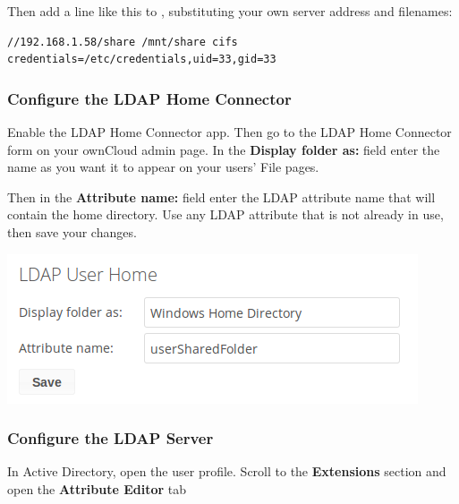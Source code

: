 \documentclass[letterpaper,10pt,english]{sphinxmanual}
\begin{document}
Then add a line like this to , substituting your own server
address and filenames:

\begin{Verbatim}[commandchars=\\\{\}]
//192.168.1.58/share /mnt/share cifs credentials=/etc/credentials,uid=33,gid=33
\end{Verbatim}


\subsubsection{Configure the LDAP Home Connector}
\label{enterprise_external_storage/ldap_home_connector_configuration:configure-the-ldap-home-connector}
Enable the LDAP Home Connector app. Then go to the LDAP Home Connector form
on your ownCloud admin page. In the \textbf{Display folder as:} field enter the name
as you want it to appear on your users' File pages.

Then in the \textbf{Attribute name:} field enter the LDAP attribute name that will
contain the home directory. Use any LDAP attribute that is not already in use,
then save your changes.

\includegraphics{ldap-home-connector-1.png}


\subsubsection{Configure the LDAP Server}
\label{enterprise_external_storage/ldap_home_connector_configuration:configure-the-ldap-server}
In Active Directory, open the user profile. Scroll to the \textbf{Extensions}
section and open the \textbf{Attribute Editor} tab
\end{document}
